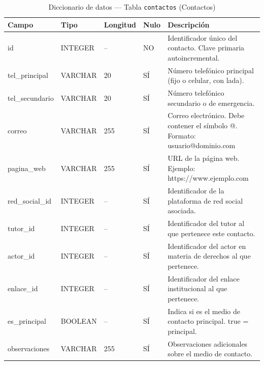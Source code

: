 \begin{table}[H]
	\centering
	\caption{Diccionario de datos --- Tabla \texttt{contactos} (Contactos)}
	\label{tab:data-dict-contactos}
	\scriptsize
	\begin{tabular}{>{\ttfamily\raggedright\arraybackslash}p{3.6cm} p{1.6cm} p{1.3cm} p{0.7cm} p{5.6cm}}
		\toprule
		\textbf{Campo} & \textbf{Tipo} & \textbf{Longitud} & \textbf{Nulo} & \textbf{Descripción} \\
		\midrule
		id & INTEGER & -- & NO & Identificador único del contacto. Clave primaria autoincremental. \\
		tel\_principal & VARCHAR & 20 & SÍ & Número telefónico principal (fijo o celular, con lada). \\
		tel\_secundario & VARCHAR & 20 & SÍ & Número telefónico secundario o de emergencia. \\
		correo & VARCHAR & 255 & SÍ & Correo electrónico. Debe contener el símbolo @. Formato: usuario@dominio.com \\
		pagina\_web & VARCHAR & 255 & SÍ & URL de la página web. Ejemplo: https://www.ejemplo.com \\
		red\_social\_id & INTEGER & -- & SÍ & Identificador de la plataforma de red social asociada. \\
		tutor\_id & INTEGER & -- & SÍ & Identificador del tutor al que pertenece este contacto. \\
		actor\_id & INTEGER & -- & SÍ & Identificador del actor en materia de derechos al que pertenece. \\
		enlace\_id & INTEGER & -- & SÍ & Identificador del enlace institucional al que pertenece. \\
		es\_principal & BOOLEAN & -- & SÍ & Indica si es el medio de contacto principal. true = principal. \\
		observaciones & VARCHAR & 255 & SÍ & Observaciones adicionales sobre el medio de contacto. \\
		\bottomrule
	\end{tabular}
\end{table}

